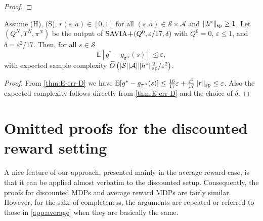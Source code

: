 \documentclass{article}
\newcommand{\cA}{\mathcal{A}}
\newcommand{\cS}{\mathcal{S}}
\newcommand{\expec}{\mathbb{E}}
\renewcommand{\sp}[1]{\|{#1}\|_\text{\rm sp}}
\newcommand{\R}{r}
\newenvironment{manualcorollary}[1]{%
    \renewcommand\themanualcorollaryinner{#1}%
  \manualcorollaryinner
}{\endmanualtheoreminner}
\theoremstyle{plain}
\theoremstyle{definition}
\theoremstyle{remark}
\begin{document}
\begin{proof}
\vspace{-3ex}
\end{proof}

\begin{manualcorollary}{\ref{cor:expected}}
   Assume \mbox{\sc (H)}, \mbox{\sc (S)},  $r(s,a) \in[0,1]$ for all $(s,a)\in \cS\times \cA$ and $\sp{h^{*}}\ge 1$. Let $(Q^N,T^N,\pi^N)$ be the output of $\mbox{\rm SAVIA$\textbf{+}$}(Q^0,\varepsilon/17,\delta)$ with  $Q^0=0$,  $\varepsilon\leq 1$, and $\delta=\varepsilon^2/17$. Then,  for all $s\in\cS$
  $$\expec[g^*-g_{\pi^N}(s)] \leq \varepsilon,$$
   with
   expected sample complexity  $\widetilde{O}\left({|\cS||\cA|\sp{h^*}^{2}}/{\varepsilon^{2}}\right)$.
\end{manualcorollary}

\begin{proof}
    From \cref{thm:E-err-D} we have
 $\expec[g^*-g_{\pi^n}(s)]\leq \frac{16}{17}\varepsilon +  \frac{\varepsilon^2}{17}\sp{\R}\leq \varepsilon$. Also the expected complexity follows directly from \cref{thm:E-err-D} and the choice of $\delta$.
\end{proof}


\section{Omitted proofs for the discounted reward setting}\label{app:discounted}
A nice feature of our approach, presented mainly in the average reward case, is that it can be applied almost verbatim to the discounted setup. Consequently, the proofs for  discounted MDPs and average reward MDPs are fairly similar. However, for the sake of completeness, the arguments are repeated or referred to those in \cref{app:average} when they are basically the same.
\end{document}
